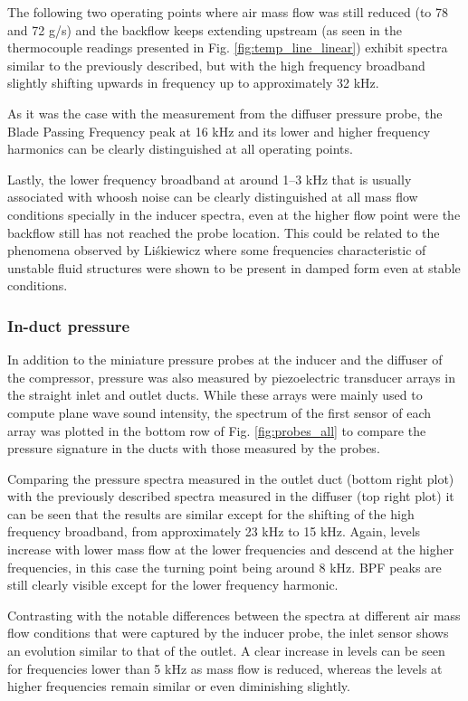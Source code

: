 The following two operating points where air mass flow was still reduced (to 78 and 72 g/s) and the backflow keeps extending upstream (as seen in the thermocouple readings presented in Fig. \ref{fig:temp_line_linear}) exhibit spectra similar to the previously described, but with the high frequency broadband slightly shifting upwards in frequency up to approximately 32 kHz.

As it was the case with the measurement from the diffuser pressure probe, the Blade Passing Frequency peak at 16 kHz and its lower and higher frequency harmonics can be clearly distinguished at all operating points. 

Lastly, the lower frequency broadband at around 1--3 kHz that is usually associated with whoosh noise can be clearly distinguished at all mass flow conditions specially in the inducer spectra, even at the higher flow point were the backflow still has not reached the probe location. This could be related to the phenomena observed by Li\'skiewicz \cite{liskiewicz2014identification} where some frequencies characteristic of unstable fluid structures were shown to be present in damped form even at stable conditions.

\subsubsection{In-duct pressure}

In addition to the miniature pressure probes at the inducer and the diffuser of the compressor, pressure was also measured by piezoelectric transducer arrays in the straight inlet and outlet ducts. While these arrays were mainly used to compute plane wave sound intensity, the spectrum of the first sensor of each array was plotted in the bottom row of Fig. \ref{fig:probes_all} to compare the pressure signature in the ducts with those measured by the  probes.

Comparing the pressure spectra measured in the outlet duct (bottom right plot) with the previously described spectra measured in the diffuser (top right plot) it can be seen that the results are similar except for the shifting of the high frequency broadband, from approximately 23 kHz to 15 kHz. Again, levels increase with lower mass flow at the lower frequencies and descend at the higher frequencies, in this case the turning point being around 8 kHz. BPF peaks are still clearly visible except for the lower frequency harmonic.

Contrasting with the notable differences between the spectra at different air mass flow conditions that were captured by the inducer probe, the inlet sensor shows an evolution similar to that of the outlet. A clear increase in levels can be seen for frequencies lower than 5 kHz as mass flow is reduced, whereas the levels at higher frequencies remain similar or even diminishing slightly.

